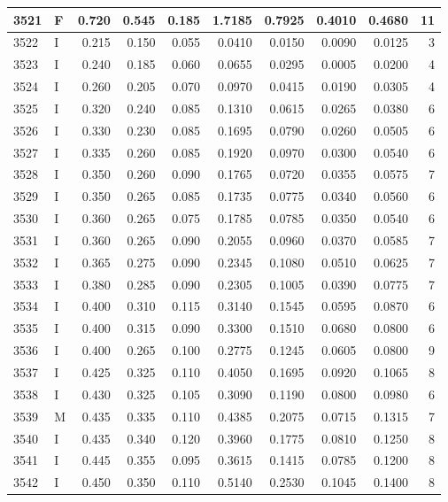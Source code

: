 \documentclass[9pt,twocolumn,twoside,]{pnas-new}
\begin{document}
\begin{tabular}{l|l|r|r|r|r|r|r|r|r}
\hline
3521 & F & 0.720 & 0.545 & 0.185 & 1.7185 & 0.7925 & 0.4010 & 0.4680 & 11\\
\hline
3522 & I & 0.215 & 0.150 & 0.055 & 0.0410 & 0.0150 & 0.0090 & 0.0125 & 3\\
\hline
3523 & I & 0.240 & 0.185 & 0.060 & 0.0655 & 0.0295 & 0.0005 & 0.0200 & 4\\
\hline
3524 & I & 0.260 & 0.205 & 0.070 & 0.0970 & 0.0415 & 0.0190 & 0.0305 & 4\\
\hline
3525 & I & 0.320 & 0.240 & 0.085 & 0.1310 & 0.0615 & 0.0265 & 0.0380 & 6\\
\hline
3526 & I & 0.330 & 0.230 & 0.085 & 0.1695 & 0.0790 & 0.0260 & 0.0505 & 6\\
\hline
3527 & I & 0.335 & 0.260 & 0.085 & 0.1920 & 0.0970 & 0.0300 & 0.0540 & 6\\
\hline
3528 & I & 0.350 & 0.260 & 0.090 & 0.1765 & 0.0720 & 0.0355 & 0.0575 & 7\\
\hline
3529 & I & 0.350 & 0.265 & 0.085 & 0.1735 & 0.0775 & 0.0340 & 0.0560 & 6\\
\hline
3530 & I & 0.360 & 0.265 & 0.075 & 0.1785 & 0.0785 & 0.0350 & 0.0540 & 6\\
\hline
3531 & I & 0.360 & 0.265 & 0.090 & 0.2055 & 0.0960 & 0.0370 & 0.0585 & 7\\
\hline
3532 & I & 0.365 & 0.275 & 0.090 & 0.2345 & 0.1080 & 0.0510 & 0.0625 & 7\\
\hline
3533 & I & 0.380 & 0.285 & 0.090 & 0.2305 & 0.1005 & 0.0390 & 0.0775 & 7\\
\hline
3534 & I & 0.400 & 0.310 & 0.115 & 0.3140 & 0.1545 & 0.0595 & 0.0870 & 6\\
\hline
3535 & I & 0.400 & 0.315 & 0.090 & 0.3300 & 0.1510 & 0.0680 & 0.0800 & 6\\
\hline
3536 & I & 0.400 & 0.265 & 0.100 & 0.2775 & 0.1245 & 0.0605 & 0.0800 & 9\\
\hline
3537 & I & 0.425 & 0.325 & 0.110 & 0.4050 & 0.1695 & 0.0920 & 0.1065 & 8\\
\hline
3538 & I & 0.430 & 0.325 & 0.105 & 0.3090 & 0.1190 & 0.0800 & 0.0980 & 6\\
\hline
3539 & M & 0.435 & 0.335 & 0.110 & 0.4385 & 0.2075 & 0.0715 & 0.1315 & 7\\
\hline
3540 & I & 0.435 & 0.340 & 0.120 & 0.3960 & 0.1775 & 0.0810 & 0.1250 & 8\\
\hline
3541 & I & 0.445 & 0.355 & 0.095 & 0.3615 & 0.1415 & 0.0785 & 0.1200 & 8\\
\hline
3542 & I & 0.450 & 0.350 & 0.110 & 0.5140 & 0.2530 & 0.1045 & 0.1400 & 8\\

\end{tabular}
\end{document}
